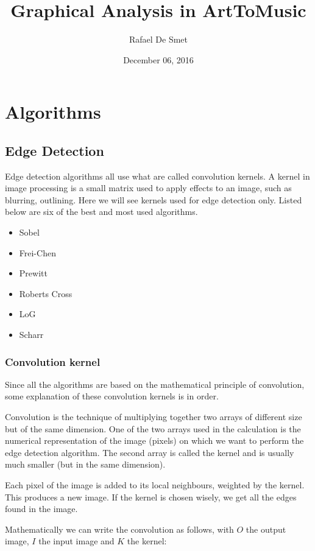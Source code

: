\documentclass[12pt]{article}
\begin{document}
\title{Graphical Analysis in ArtToMusic}
\date{December 06, 2016}
\author{Rafael De Smet}

\maketitle

\section{Algorithms}
\subsection{Edge Detection}

Edge detection algorithms all use what are called convolution kernels. A kernel in image processing is a small matrix used to apply effects to an image, such as blurring, outlining. Here we will see kernels used for edge detection only. Listed below are six of the best and most used algorithms.

\begin{itemize}
	\item Sobel 
	\item Frei-Chen
	\item Prewitt
	\item Roberts Cross
	\item LoG
	\item Scharr
\end{itemize}

\subsubsection{Convolution kernel}
Since all the algorithms are based on the mathematical principle of convolution, some explanation of these convolution kernels is in order. 

Convolution is the technique of multiplying together two arrays of different size but of the same dimension. One of the two arrays used in the calculation is the numerical representation of the image (pixels) on which we want to perform the edge detection algorithm. The second array is called the kernel and is usually much smaller (but in the same dimension).

Each pixel of the image is added to its local neighbours, weighted by the kernel. This produces a new image. If the kernel is chosen wisely, we get all the edges found in the image.

Mathematically we can write the convolution as follows, with $O$ the output image, $I$ the input image and $K$ the kernel:
\end{document}
